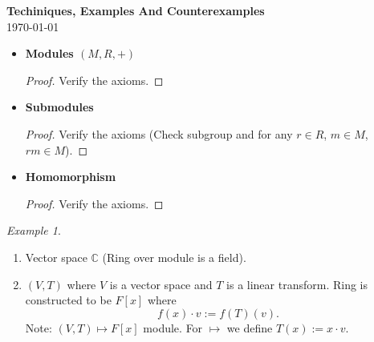 \documentclass[11pt]{article}
\theoremstyle{definition}
\theoremstyle{remark}
\newtheorem{example}{Example}[section]
\begin{document}
\begin{center}
{\Large\textbf{Techiniques, Examples And Counterexamples}}\\
\vspace{0.3cm}
{\normalsize\today}
\end{center}
\vspace{0.5cm}


\begin{itemize}
    \item \textbf{Modules $(M, R, +)$}
    \begin{proof}
        Verify the axioms.
    \end{proof}

    \item \textbf{Submodules}
    \begin{proof}
        Verify the axioms (Check subgroup and for any $r \in R$, $m \in M$, $rm \in M$).
    \end{proof}

    \item \textbf{Homomorphism}
    \begin{proof}
        Verify the axioms.
    \end{proof}
\end{itemize}


\begin{example}\label{ex:modules}
    \begin{enumerate}
        \item Vector space $\mathbb{C}$ (Ring over module is a field).
        \item $(V, T)$ where $V$ is a vector space and $T$ is a linear transform. Ring is constructed to be $F[x]$ where
              \[
              f(x) \cdot v := f(T)(v).
              \]
              Note: $(V, T) \longmapsto F[x]$ module.
              For $\longmapsto$ we define $T(x) := x \cdot v$.
    \end{enumerate}
\end{example}
\end{document}
